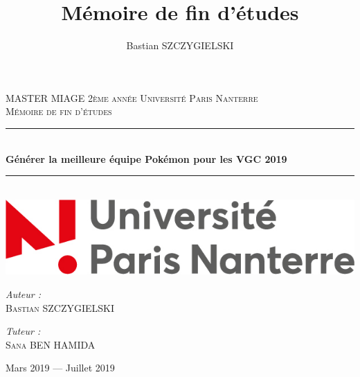 \documentclass[12pt, twoside, openright]{report}
\author{Bastian SZCZYGIELSKI}
\title{Mémoire de fin d'études}
\begin{document}
%

\setlength{\parindent}{0cm}
\setlength{\parskip}{1ex plus 0.5ex minus 0.2ex}
\newcommand{\hsp}{\hspace{20pt}}
\newcommand{\HRule}{\rule{\linewidth}{0.5mm}}

\begin{titlepage}
  \begin{sffamily}
  \begin{center}

    \textsc{\LARGE MASTER MIAGE 2ème année \linebreak Université Paris Nanterre}\\[2cm]

    \textsc{\Large Mémoire de fin d'études}\\[1.5cm]

    \HRule \\[0.4cm]
    { \huge \bfseries Générer la meilleure équipe Pokémon pour les VGC 2019\\[0.4cm] }

    \HRule \\[2cm]
    \includegraphics[scale=0.40]{img/logo_nanterre.jpg}
    \hspace{2cm}
    
    \vfill
  \begin{minipage}{0.4\textwidth}
      \begin{flushleft} \large
        \emph{Auteur :}\\ \textsc{Bastian SZCZYGIELSKI}\\
      \end{flushleft}
    \end{minipage}
    \begin{minipage}{0.4\textwidth}
      \begin{flushright} \large
        \emph{Tuteur :}\\ \textsc{Sana BEN HAMIDA}\\
      \end{flushright}
    \end{minipage}
    \vfill
    {\large Mars 2019 — Juillet 2019}
  \end{center}
  \end{sffamily}
\end{titlepage}
\end{document}
